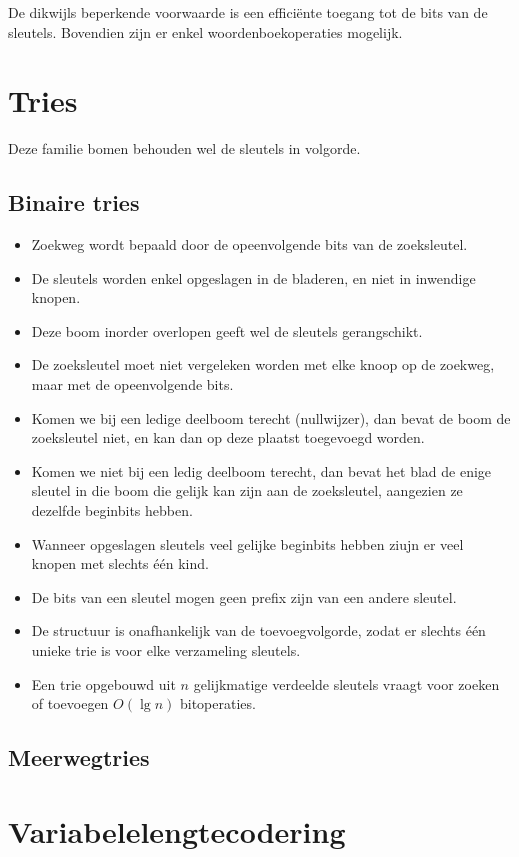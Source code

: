 \documentclass{report}
\begin{document}
\alert{}   De dikwijls beperkende voorwaarde is een efficiënte toegang tot de bits van de sleutels. Bovendien zijn er enkel woordenboekoperaties mogelijk.

\section{Tries}
Deze familie bomen behouden wel de sleutels in volgorde.
\subsection{Binaire tries}
\begin{itemize}
	\item[\info] Zoekweg wordt bepaald door de opeenvolgende bits van de zoeksleutel.
	\item[\info] De sleutels worden enkel opgeslagen in de bladeren, en niet in inwendige knopen.
	\item[\good] Deze boom inorder overlopen geeft wel de sleutels gerangschikt.
	\item[\good] De zoeksleutel moet niet vergeleken worden met elke knoop op de zoekweg, maar met de opeenvolgende bits.  
	\item[\info] Komen we bij een ledige deelboom terecht (nullwijzer), dan bevat de boom de zoeksleutel niet, en kan dan op deze plaatst toegevoegd worden.
	\item[\info] Komen we niet bij een ledig deelboom terecht, dan bevat het blad de enige sleutel in die boom die gelijk kan zijn aan de zoeksleutel, aangezien ze dezelfde beginbits hebben.
	\item[\alert] Wanneer opgeslagen sleutels veel gelijke beginbits hebben ziujn er veel knopen met slechts één kind.
	\item[\alert] De bits van een sleutel mogen geen prefix zijn van een andere sleutel. 
	\item[\good] De structuur is onafhankelijk van de toevoegvolgorde, zodat er slechts één unieke trie is voor elke verzameling sleutels.
	\item[\info] Een trie opgebouwd uit $n$ gelijkmatige verdeelde sleutels vraagt voor zoeken of toevoegen $O(\lg n)$ bitoperaties. 
\end{itemize}


\subsection{Meerwegtries}


\section{Variabelelengtecodering}
\end{document}
